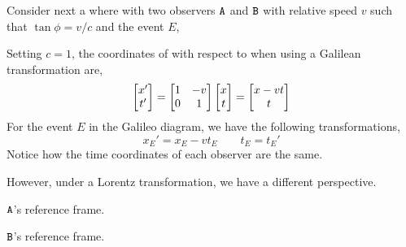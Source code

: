 \documentclass{article}
\begin{document}
Consider next a  where with two observers $\texttt{A}$ and $\texttt{B}$ with relative speed $v$ such that $\tan \phi = v/c$ and the event $E$,

\begin{center}
\end{center}

Setting $c = 1$, the coordinates of  with respect to  when using a Galilean transformation are,
\[ \begin{bmatrix}x' \\ t'\end{bmatrix} = \begin{bmatrix}1 & - v \\ 0 & 1\end{bmatrix} \begin{bmatrix}x \\ t\end{bmatrix} = \begin{bmatrix}x - v t \\ t\end{bmatrix} \]
For the event $E$ in the Galileo diagram, we have the following transformations,
\[ x_E' = x_E - v t_E \qquad t_E = t_E' \]
Notice how the time coordinates of each observer are the same.

However, under a Lorentz transformation, we have a different perspective.

\begin{center}
  \begin{minipage}[b]{0.45\textwidth}
    \begin{center}
    $\texttt{A}$'s reference frame.
    \end{center}
  \end{minipage}
  \begin{minipage}[b]{0.45\textwidth}
    \begin{center}
    $\texttt{B}$'s reference frame.
    \end{center}
  \end{minipage}
\end{center}
\end{document}

